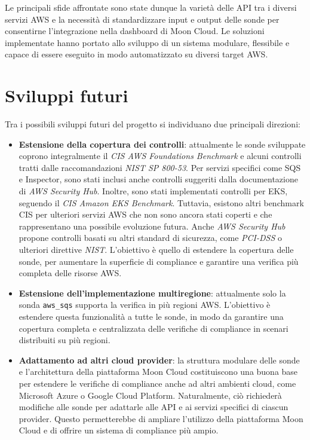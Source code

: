 Le principali sfide affrontate sono state dunque la varietà delle API tra i diversi servizi AWS e la necessità di standardizzare input e output delle sonde per consentirne l'integrazione nella dashboard di Moon Cloud. Le soluzioni implementate hanno portato allo sviluppo di un sistema modulare, flessibile e capace di essere eseguito in modo automatizzato su diversi target AWS.

\section{Sviluppi futuri}
\label{sec:sviluppi_futuri}

Tra i possibili sviluppi futuri del progetto si individuano due principali direzioni:

\begin{itemize}
  \item \textbf{Estensione della copertura dei controlli}: attualmente le sonde sviluppate coprono integralmente il \emph{CIS AWS Foundations Benchmark} e alcuni controlli tratti dalle raccomandazioni \emph{NIST SP 800-53}. Per servizi specifici come SQS e Inspector, sono stati inclusi anche controlli suggeriti dalla documentazione di \emph{AWS Security Hub}. Inoltre, sono stati implementati controlli per EKS, seguendo il \emph{CIS Amazon EKS Benchmark}. Tuttavia, esistono altri benchmark CIS per ulteriori servizi AWS che non sono ancora stati coperti e che rappresentano una possibile evoluzione futura. Anche \emph{AWS Security Hub} propone controlli basati su altri standard di sicurezza, come \emph{PCI-DSS} o ulteriori direttive \emph{NIST}. L'obiettivo è quello di estendere la copertura delle sonde, per aumentare la superficie di compliance e garantire una verifica più completa delle risorse AWS.




  \item \textbf{Estensione dell'implementazione multiregione}: attualmente solo la sonda \texttt{aws\_sqs} supporta la verifica in più regioni AWS. L'obiettivo è estendere questa funzionalità a tutte le sonde, in modo da garantire una copertura completa e centralizzata delle verifiche di compliance in scenari distribuiti su più regioni. 

  \item \textbf{Adattamento ad altri cloud provider}: la struttura modulare delle sonde e l'architettura della piattaforma Moon Cloud costituiscono una buona base per estendere le verifiche di compliance anche ad altri ambienti cloud, come Microsoft Azure o Google Cloud Platform. Naturalmente, ciò richiederà modifiche alle sonde per adattarle alle API e ai servizi specifici di ciascun provider. Questo permetterebbe di ampliare l'utilizzo della piattaforma Moon Cloud e di offrire un sistema di compliance più ampio.
\end{itemize}


